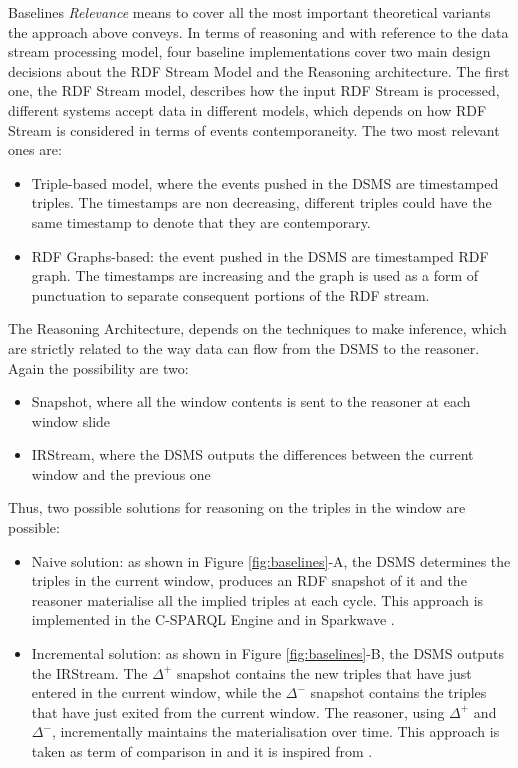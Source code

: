 Baselines \textit{Relevance} means to cover all the most important theoretical variants the approach above conveys. In terms of reasoning and with reference to the data stream processing model, four baseline implementations cover two main design decisions about the RDF Stream Model and the Reasoning architecture.  The first one, the RDF Stream model,  describes how the input RDF Stream is processed, different systems accept data in different models, which depends on how RDF Stream is considered in terms of events contemporaneity. The two most relevant ones are:
\begin{itemize}	
\item Triple-based model, where the events pushed in the DSMS are timestamped triples. The timestamps are non decreasing, different triples could have the same timestamp to denote that they are contemporary.
\item RDF Graphs-based: the event pushed in the DSMS are timestamped RDF graph. The timestamps are increasing and the graph is used as a form of punctuation \cite{Tatbul2003b} to separate consequent portions of the RDF stream.
\end{itemize}
The Reasoning Architecture, depends on the techniques to make inference, which are strictly related to the way data can flow from the DSMS to the reasoner. Again the possibility are two:
\begin{itemize}
\item Snapshot, where all the window contents is sent to the reasoner at each window slide
\item IRStream, where the DSMS  outputs the differences between the current window and the previous one
\end{itemize}
Thus, two possible solutions for reasoning on the triples in the window are possible: 
\begin{itemize}
\item Naive solution: as shown in Figure \ref{fig:baselines}-A, the DSMS determines the triples in the current window, produces an RDF snapshot of it and the reasoner materialise all the implied triples at each cycle. This approach is implemented in the C-SPARQL Engine \cite{DBLP:journals/sigmod/BarbieriBCVG10} and in Sparkwave \cite{DBLP:conf/debs/KomazecCF12}.
\item Incremental solution: as shown in Figure \ref{fig:baselines}-B, the DSMS outputs the IRStream. The $\Delta^{+}$ snapshot contains the new triples that have just entered in the current window, while the $\Delta^{-}$ snapshot contains the triples that have just exited from the current window. The reasoner, using $\Delta^{+}$ and $\Delta^{-}$, incrementally maintains the materialisation over time. This approach is taken as term of comparison in \cite{DellAglio2014} and it is inspired from \cite{DBLP:conf/cikm/RenP11}.
\end{itemize}

